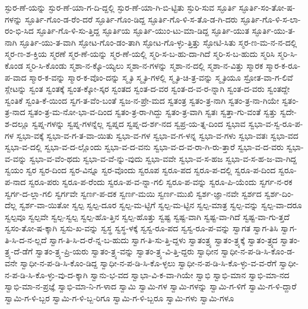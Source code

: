 {ಸ್ಫುರ-ಣೆ-ಯನ್ನು
ಸ್ಫುರ-ಣೆ-ಯಾ-ಗ-ದಿ-ದ್ದಲ್ಲಿ
ಸ್ಫುರ-ಣೆ-ಯಾ-ಗಿ-ಬಿ-ಟ್ಟಿತು
ಸ್ಫುರಿ-ಸುವ
ಸ್ಫೂರ್ತಿ
ಸ್ಫೂರ್ತಿ-ಸಂ-ತೋ-ಷ-ಗಳನ್ನು
ಸ್ಫೂರ್ತಿ-ಗೊಂ-ಡ-ರೆಂ-ದರೆ
ಸ್ಫೂರ್ತಿ-ಗೊಂ-ಡಿದ್ದ
ಸ್ಫೂರ್ತಿ-ಗೊ-ಳಿ-ಸ-ತೊ-ಡ-ಗಿ-ದರು
ಸ್ಫೂರ್ತಿ-ಗೊ-ಳಿ-ಸ-ಲಾ-ರಂ-ಭಿ-ಸಿದ
ಸ್ಫೂರ್ತಿ-ಗೊ-ಳಿ-ಸು-ತ್ತಿದ್ದ
ಸ್ಫೂರ್ತಿಯ
ಸ್ಫೂರ್ತಿ-ಯುಂ-ಟು-ಮಾ-ಡಿದ್ದ
ಸ್ಫೂರ್ತಿ-ಯುತ
ಸ್ಫೂರ್ತಿ-ಯು-ತ-ನಾಗಿ
ಸ್ಫೂರ್ತಿ-ಯು-ತ-ವಾಗಿ
ಸ್ಫೋಟ-ಗೊಂ-ಡಂ-ತಾಗಿ
ಸ್ಫೋಟ-ಗೊ-ಳ್ಳು-ತ್ತಿತ್ತು
ಸ್ಫೋಟಿ-ಸಿತು
ಸ್ಮರ-ಣ-ಮ-ನ-ನ-ದಲ್ಲಿ
ಸ್ಮರ-ಣ-ಶ-ಕ್ತಿಯ
ಸ್ಮರಣೆ
ಸ್ಮರ-ಣೆ-ಯನ್ನು
ಸ್ಮರ-ಣೆ-ಯಲ್ಲಿ
ಸ್ಮರಿ-ಸ-ಬ-ಹು-ದಾ-ಗಿದೆ
ಸ್ಮರಿ-ಸ-ಬ-ಹುದು
ಸ್ಮರಿಸಿ
ಸ್ಮರಿ-ಸಿ-ಕೊಂಡ
ಸ್ಮರಿ-ಸಿ-ಕೊಂಡು
ಸ್ಮಶಾ-ನ-ಕ್ಕೊ-ಯ್ಯಲು
ಸ್ಮಶಾ-ನ-ಗಳನ್ನು
ಸ್ಮಶಾ-ನ-ದಲ್ಲಿ
ಸ್ಮಶಾ-ನ-ವಿತ್ತು
ಸ್ಮಾರಕ
ಸ್ಮಾರ-ಕ-ರೂ-ಪ-ವಾದ
ಸ್ಮಾರ-ಕ-ವನ್ನು
ಸ್ಮಾರ-ಕ-ವೊಂ-ದನ್ನು
ಸ್ಮೃತಿ
ಸ್ಮೃತಿ-ಗಳಲ್ಲಿ
ಸ್ಮೃತಿ-ಚಿ-ತ್ರ-ವನ್ನು
ಸ್ಮೃತಿಯೂ
ಸ್ರೋತ-ವಾ-ಗ-ಲಿವೆ
ಸ್ಲೇಟನ್ನು
ಸ್ವಂತ
ಸ್ವಂತಕ್ಕೆ
ಸ್ವಂತ-ಕ್ಕೋ-ಸ್ಕರ
ಸ್ವಂತದ
ಸ್ವಂತ-ದ-ವರ
ಸ್ವಂತ-ದ-ವ-ರ-ನ್ನಾಗಿ
ಸ್ವಂತ-ದ-ವರು
ಸ್ವಂತದ್ದೇ
ಸ್ವಂತಿಕೆ
ಸ್ವಂತಿ-ಕೆ-ಯಿಂದ
ಸ್ವಗ-ತ-ವೆಂ-ಬಂತೆ
ಸ್ವಜ-ನ-ಪ್ರೇ-ಮದ
ಸ್ವತಂತ್ರ
ಸ್ವತಂ-ತ್ರ-ನಾಗಿ
ಸ್ವತಂ-ತ್ರ-ನಾ-ಗಿಯೇ
ಸ್ವತಂ-ತ್ರ-ನಾದ
ಸ್ವತಂ-ತ್ರ-ಮ-ನೋ-ಭಾ-ವ-ದಿಂದ
ಸ್ವತಂ-ತ್ರ-ರಾ-ಗಿದ್ದು
ಸ್ವತಂ-ತ್ರ-ವಾಗಿ
ಸ್ವತಃ
ಸ್ವತ್ತಾ-ಗು-ವಂತೆ
ಸ್ವತ್ತು
ಸ್ವದೇ-ಶ-ದಲ್ಲೂ
ಸ್ವಪ್ನ-ಗಳನ್ನು
ಸ್ವಪ್ನ-ಗಳನ್ನೆಲ್ಲ
ಸ್ವಪ್ನದ
ಸ್ವಪ್ನ-ದ-ರ್ಶ-ನದ
ಸ್ವಪ್ರ-ಯ-ತ್ನ-ದಿಂದ
ಸ್ವಭಾವ
ಸ್ವಭಾ-ವ-ಸ್ವ-ರೂ-ಪ-ಗಳ
ಸ್ವಭಾ-ವಕ್ಕೆ
ಸ್ವಭಾ-ವ-ಗ-ತ-ವಾ-ಯಿತು
ಸ್ವಭಾ-ವ-ಗಳ
ಸ್ವಭಾ-ವ-ಗ-ಳನ್ನ
ಸ್ವಭಾ-ವ-ಗಳು
ಸ್ವಭಾ-ವತಃ
ಸ್ವಭಾ-ವದ
ಸ್ವಭಾ-ವ-ದಲ್ಲಿ
ಸ್ವಭಾ-ವ-ದ-ಲ್ಲೊಂದು
ಸ್ವಭಾ-ವ-ದ-ವನು
ಸ್ವಭಾ-ವ-ದ-ವ-ರಾ-ಗಿ-ರು-ತ್ತಾರೆ
ಸ್ವಭಾ-ವ-ದ-ವರು
ಸ್ವಭಾ-ವ-ವನ್ನು
ಸ್ವಭಾ-ವ-ವೆಂ-ಥದು
ಸ್ವಭಾ-ವ-ವೆ-ನ್ನು-ವುದು
ಸ್ವಭಾ-ವವೇ
ಸ್ವಭಾ-ವ-ಸ-ಹಜ
ಸ್ವಭಾ-ವ-ಸ-ಹ-ಜ-ವಾ-ಗಿದ್ದ
ಸ್ವಯಂ
ಸ್ವರ
ಸ್ವರ-ದಿಂದ
ಸ್ವರ-ವಿನ್ನೂ
ಸ್ವರ-ವೊಂದು
ಸ್ವರೂಪ
ಸ್ವರೂ-ಪದ
ಸ್ವರೂ-ಪ-ದಲ್ಲಿ
ಸ್ವರೂ-ಪ-ದಿಂದ
ಸ್ವರೂ-ಪ-ನಾದ
ಸ್ವರೂ-ಪರು
ಸ್ವರೂ-ಪ-ರೆಂದು
ಸ್ವರೂ-ಪ-ವ-ನ್ನಾ-ಗಲಿ
ಸ್ವರೂ-ಪ-ವನ್ನು
ಸ್ವರೂ-ಪಿ-ಯೆಂದು
ಸ್ವರ್ಗ-ನ-ರಕ
ಸ್ವರ್ಗ-ದ-ಲ್ಲಾ-ಗಲಿ
ಸ್ವರ್ಗವೇ
ಸ್ವರ್ಣ-ಪ-ದಕ
ಸ್ವರ್ಣ-ಮಯಿ
ಸ್ವರ್ಣ-ಮುಖಿ
ಸ್ವರ್ಶ-ಜ್ಞಾ-ನವೇ
ಸ್ವರ್ಶದ
ಸ್ವರ್ಶ-ದಿಂ-ದೆಲ್ಲ
ಸ್ವರ್ಶ-ವಾ-ಯಿತೋ
ಸ್ವಲ್ಪ
ಸ್ವಲ್ಪ-ದೂರ
ಸ್ವಲ್ಪ-ಮ-ಟ್ಟಿಗೆ
ಸ್ವಲ್ಪ-ಮ-ಟ್ಟಿನ
ಸ್ವಲ್ಪ-ಮಾತ್ರ
ಸ್ವಲ್ಪ-ವನ್ನು
ಸ್ವಲ್ಪ-ವಾ-ದರೂ
ಸ್ವಲ್ಪವೂ
ಸ್ವಲ್ಪವೇ
ಸ್ವಲ್ಪ-ಸ್ವಲ್ಪ
ಸ್ವಲ್ಪ-ಹೊ-ತ್ತಿನ
ಸ್ವಲ್ಪ-ಹೊತ್ತು
ಸ್ವಷ್ಟ
ಸ್ವಷ್ಟ-ವಾಗಿ
ಸ್ವಷ್ಟ-ವಾ-ಗಿದೆ
ಸ್ವಷ್ಟ-ವಾ-ಗು-ತ್ತದೆ
ಸ್ವಸಂ-ತೋ-ಷ-ಕ್ಕಾಗಿ
ಸ್ವಸು-ಖ-ವನ್ನು
ಸ್ವಸ್ಥ
ಸ್ವಸ್ಥ-ಳಕ್ಕೆ
ಸ್ವಸ್ವ-ರೂ-ಪದ
ಸ್ವಸ್ವ-ರೂ-ಪ-ವನ್ನು
ಸ್ವಾಗತ
ಸ್ವಾಗ-ತಿಸಿ
ಸ್ವಾಗ-ತಿ-ಸಿ-ದ-ನ-ಲ್ಲದೆ
ಸ್ವಾಗ-ತಿ-ಸಿ-ದ-ರೆ-ನ್ನ-ಬ-ಹುದು
ಸ್ವಾಗ-ತಿ-ಸು-ತ್ತಿ-ದ್ದಳು
ಸ್ವಾತಂತ್ರ್ಯ
ಸ್ವಾತಂ-ತ್ರ್ಯಕ್ಕೆ
ಸ್ವಾತಂ-ತ್ರ್ಯದ
ಸ್ವಾತಂ-ತ್ರ್ಯ-ದೆ-ಡೆಗೆ
ಸ್ವಾತಂ-ತ್ರ್ಯ-ಪ್ರಿ-ಯರು
ಸ್ವಾತಂ-ತ್ರ್ಯ-ವನ್ನು
ಸ್ವಾತಂ-ತ್ರ್ಯ-ವಿ-ತ್ತಿ-ದ್ದರು
ಸ್ವಾಧೀನ
ಸ್ವಾಧೀ-ನ-ಪ-ಡಿ-ಸಿ-ಕೊಂ-ಡ-ವನೇ
ಸ್ವಾಧೀ-ನ-ಪ-ಡಿ-ಸಿ-ಕೊಂ-ಡಿದ್ದ
ಸ್ವಾಧೀ-ನ-ಪ-ಡಿ-ಸಿ-ಕೊ-ಳ್ಳಲು
ಸ್ವಾಧೀ-ನ-ಪ-ಡಿ-ಸಿ-ಕೊ-ಳ್ಳು-ವ-ವ-ರೆಗೆ
ಸ್ವಾಧೀ-ನ-ಪ-ಡಿ-ಸಿ-ಕೊ-ಳ್ಳು-ವು-ದ-ಕ್ಕಾಗಿ
ಸ್ವಾನು-ಭ-ವದ
ಸ್ವಾಭಾ-ವಿ-ಕ-ವಾ-ಗಿಯೇ
ಸ್ವಾಭಿ
ಸ್ವಾಭಿ-ಮಾನ
ಸ್ವಾಭಿ-ಮಾ-ನದ
ಸ್ವಾಭಿ-ಮಾ-ನ-ಪ್ರಜ್ಞೆ
ಸ್ವಾಭಿ-ಮಾ-ನಿ-ಗ-ಳಾದ
ಸ್ವಾಮಿ
ಸ್ವಾಮಿ-ಗಳ
ಸ್ವಾಮಿ-ಗಳನ್ನು
ಸ್ವಾಮಿ-ಗ-ಳಿಗೆ
ಸ್ವಾಮಿ-ಗ-ಳಿ-ದ್ದಾರೆ
ಸ್ವಾಮಿ-ಗ-ಳಿ-ಬ್ಬರ
ಸ್ವಾಮಿ-ಗ-ಳಿ-ಬ್ಬ-ರಿಗೂ
ಸ್ವಾಮಿ-ಗ-ಳಿ-ಬ್ಬರೂ
ಸ್ವಾಮಿ-ಗಳು
ಸ್ವಾಮಿ-ಗಳೂ
}
